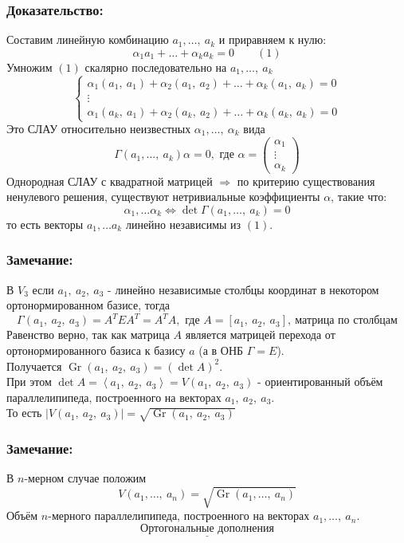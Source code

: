 \documentclass[12pt, letterpaper, twoside]{article}
\begin{document}
    \subsubsection*{Доказательство:}
    Составим линейную комбинацию $a_1,\dots,\ a_k$ и приравняем к нулю:
    \[\alpha_1 a_1 + \dots + \alpha_k a_k = 0\quad\quad (1)\]
    Умножим $(1)$ скалярно последовательно на $a_1,\dots,\ a_k$
    \[\begin{cases}
        \alpha_1 (a_1,\ a_1) + \alpha_2 (a_1,\ a_2) + \dots + \alpha_k(a_1,\ a_k) = 0\\
        \vdots\\
        \alpha_1(a_k,\ a_1) + \alpha_2 (a_k,\ a_2) + \dots + \alpha_k (a_k,\ a_k) = 0
    \end{cases}\]
    Это СЛАУ относительно неизвестных $\alpha_1,\dots,\ \alpha_k$ вида
    \[\Gamma(a_1,\dots,\ a_k)\alpha = 0,\text{ где }\alpha = \begin{pmatrix}
        \alpha_1\\
        \vdots\\
        \alpha_k
    \end{pmatrix}\]
    Однородная СЛАУ с квадратной матрицей $\Rightarrow$ по критерию существования ненулевого решения, существуют нетривиальные коэффициенты $\alpha$, такие что:
    \[\alpha_1,\dots \alpha_k \Leftrightarrow \det \Gamma(a_1,\dots,\ a_k) = 0\]
    то есть векторы $a_1,\dots a_k$ линейно независимы из $(1)$.
    \subsubsection*{Замечание:}
    В $V_3$ если $a_1,\ a_2,\ a_3$ - линейно независимые столбцы координат в некотором ортонормированном базисе, тогда
    \[\Gamma (a_1,\ a_2,\ a_3) = A^T E A^T = A^T A,\text{ где } A = [a_1,\ a_2,\ a_3],\ \text{матрица по столбцам}\]
    Равенство верно, так как матрица $A$ является матрицей перехода от ортонормированного базиса к базису $a$ (а в ОНБ $\Gamma = E$).\\
    Получается $\operatorname{Gr}(a_1,\ a_2,\ a_3) = \left(\det A\right)^2$.\\
    При этом $\det A = \left<a_1,\ a_2,\ a_3 \right> = V(a_1,\ a_2,\ a_3)$ - ориентированный объём параллелипипеда, построенного на векторах $a_1,\ a_2,\ a_3$.\\
    То есть $|V(a_1,\ a_2,\ a_3)| = \sqrt{\operatorname{Gr}(a_1,\ a_2,\ a_3)}$
    \subsubsection*{Замечание:}
    В $n$-мерном случае положим
    \[V(a_1,\dots,\ a_n) = \sqrt{\operatorname{Gr}(a_1,\dots,\ a_n)}\]
    Объём $n$-мерного параллелипипеда, построенного на векторах $a_1,\dots,\ a_n$.
    \[\underline{\text{Ортогональные дополнения}}\]
\end{document}
